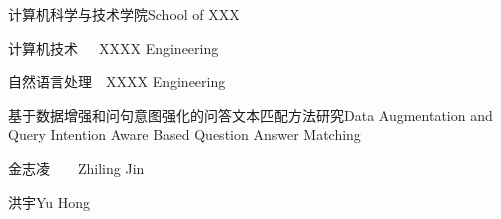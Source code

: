 
\school
{计算机科学与技术学院}{School of XXX}

\major
{计算机技术~~~}{XXXX Engineering}

\direct
{自然语言处理~~}{XXXX Engineering}

\thesistitle
{基于数据增强和问句意图强化的问答文本匹配方法研究}{Data Augmentation and Query Intention Aware Based Question Answer Matching}

\thesisauthor
{金志凌~~~~}{Zhiling Jin}

\teacher
{洪宇}{Yu Hong}





